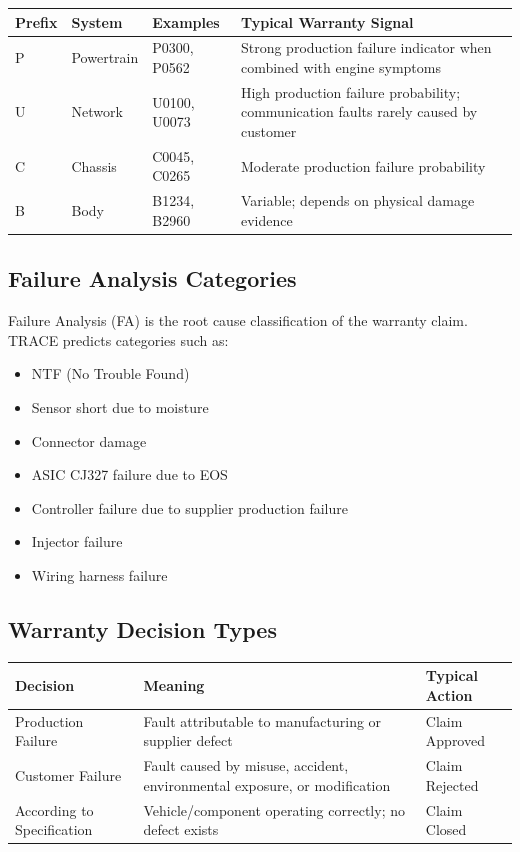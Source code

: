\documentclass[10pt]{article}
\begin{document}
\begin{table}[h!]
\centering
\begin{tabular}{|p{1.5cm}|p{3cm}|p{4cm}|p{5cm}|}
\hline
\textbf{Prefix} & \textbf{System} & \textbf{Examples} & \textbf{Typical Warranty Signal} \\ \hline
P & Powertrain & P0300, P0562 & Strong production failure indicator when combined with engine symptoms \\ \hline
U & Network & U0100, U0073 & High production failure probability; communication faults rarely caused by customer \\ \hline
C & Chassis & C0045, C0265 & Moderate production failure probability \\ \hline
B & Body & B1234, B2960 & Variable; depends on physical damage evidence \\ \hline
\end{tabular}
\end{table}

\subsection{Failure Analysis Categories}

Failure Analysis (FA) is the root cause classification of the warranty claim. TRACE predicts categories such as:

\begin{itemize}
    \item NTF (No Trouble Found)
    \item Sensor short due to moisture
    \item Connector damage
    \item ASIC CJ327 failure due to EOS
    \item Controller failure due to supplier production failure
    \item Injector failure
    \item Wiring harness failure
\end{itemize}

\subsection{Warranty Decision Types}

\begin{table}[h!]
\centering
\begin{tabular}{|p{4cm}|p{6cm}|p{5cm}|}
\hline
\textbf{Decision} & \textbf{Meaning} & \textbf{Typical Action} \\ \hline
Production Failure & Fault attributable to manufacturing or supplier defect & Claim Approved \\ \hline
Customer Failure & Fault caused by misuse, accident, environmental exposure, or modification & Claim Rejected \\ \hline
According to Specification & Vehicle/component operating correctly; no defect exists & Claim Closed \\ \hline
\end{tabular}
\end{table}
\end{document}
